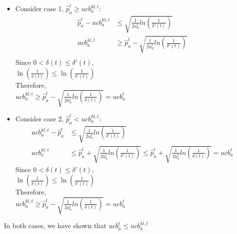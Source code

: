 \documentclass{article}
\begin{document}
\begin{itemize}
    \item {Consider case 1, $\hat{p}_a^t \ge ucb_a^{kl,t}$:   
            \begin{align*}
                \hat{p}_a^t - ucb_a^{kl,t} &\le \sqrt{\frac{1}{2u_a^t} ln(\frac{1}{\delta'(t)})}\\
                ucb_a^{kl,t} &\ge \hat{p}_a^t - \sqrt{\frac{1}{2u_a^t} ln(\frac{1}{\delta'(t)})}\\
            \end{align*}
        Since $0 < \delta(t) \le \delta'(t)$,\\
        $\ln(\frac{1}{\delta(t)}) \le \ln(\frac{1}{\delta'(t)})$ \\
        Therefore, \\
        $ucb_a^{kl,t} \ge \hat{p}_a^t - \sqrt{\frac{1}{2u_a^t} ln(\frac{1}{\delta(t)})} = ucb_a^t$ \\
        }
    \item {Consider case 2, $\hat{p}_a^t < ucb_a^{kl,t}$:   
            \begin{align*}
                ucb_a^{kl,t} - \hat{p}_a^t &\le \sqrt{\frac{1}{2u_a^t} ln(\frac{1}{\delta'(t)})} \\
                ucb_a^{kl,t} &\le \hat{p}_a^t + \sqrt{\frac{1}{2u_a^t} ln(\frac{1}{\delta'(t)})} \le \hat{p}_a^t + \sqrt{\frac{1}{2u_a^t} ln(\frac{1}{\delta(t)})} = ucb_a^t
            \end{align*}
        Since $0 < \delta(t) \le \delta'(t)$,\\
        $\ln(\frac{1}{\delta(t)}) \le \ln(\frac{1}{\delta'(t)})$ \\
        Therefore, \\
        $ucb_a^{kl,t} \ge \hat{p}_a^t - \sqrt{\frac{1}{2u_a^t} ln(\frac{1}{\delta(t)})} = ucb_a^t$ \\
        }
\end{itemize}
In both cases, we have shown that $ucb_a^t \le ucb_a^{kl,t}$

    
\end{document}
